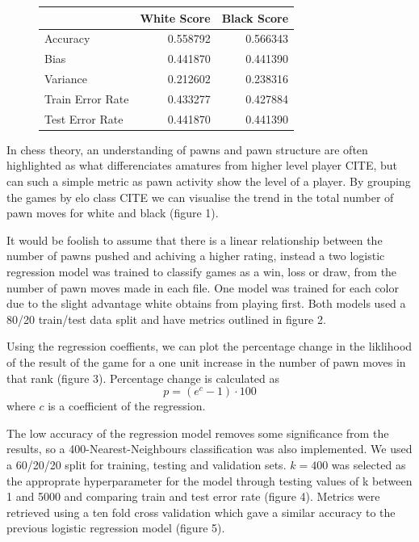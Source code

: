 \documentclass[11pt,a4paper]{article}
\begin{document}
\begin{figure}
  \centering
\begin{tabular}{lrr}
  \toprule
  {} &  White Score &  Black Score \\
  \midrule
  Accuracy         &     0.558792 &      0.566343 \\
  Bias             &     0.441870 &      0.441390 \\
  Variance         &     0.212602 &      0.238316 \\
  Train Error Rate &     0.433277 &      0.427884 \\
  Test Error Rate  &     0.441870 &      0.441390 \\
  \bottomrule
  \end{tabular}
  \caption{}
\end{figure}



In chess theory, an understanding of pawns and pawn structure are often highlighted as what differenciates amatures from higher level player CITE, but can such a simple metric as pawn activity show the level of a player. 
  By grouping the games by elo class CITE we can visualise the trend in the total number of pawn moves for white and black (figure 1). 

It would be foolish to assume that there is a linear relationship between the number of pawns pushed and achiving a higher rating, 
instead a two logistic regression model was trained to classify games as a win, loss or draw, from the number of pawn moves made in each file. 
One model was trained for each color due to the slight advantage white obtains from playing first. Both models used a 80/20 train/test data split and have metrics outlined in figure 2. 

Using the regression coeffients, we can plot the percentage change in the liklihood of the result of the game for a one unit increase in the number of pawn moves 
in that rank (figure 3).
Percentage change is calculated as \[p = (e^{c}-1)\cdot 100\] where \(c\) is a coefficient of the regression. 

The low accuracy of the regression model removes some significance from the results, so a 400-Nearest-Neighbours classification was also implemented. 
We used a 60/20/20 split for training, testing and validation sets. 
\(k=400\) was selected as the approprate hyperparameter for the model through testing values of k between 1 and 5000 and comparing train and test error rate (figure 4).   
Metrics were retrieved using a ten fold cross validation which gave a similar accuracy to the previous logistic regression model (figure 5).  
\end{document}
